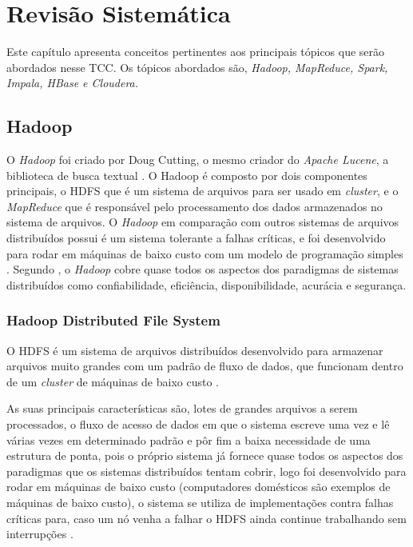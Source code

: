 \chapter[Revisão Sistemática]{Revisão Sistemática}

    Este capítulo apresenta conceitos pertinentes aos principais tópicos que serão abordados
    nesse TCC. Os tópicos abordados são, \textit{Hadoop, MapReduce, Spark, Impala, HBase e
    Cloudera.}

    \section{Hadoop}

        O \textit{Hadoop} foi criado por Doug Cutting, o mesmo criador do \textit{Apache Lucene}, a biblioteca de
        busca textual \cite{white2015}. O Hadoop é composto por dois componentes principais, o HDFS que é um
        sistema de arquivos para ser usado em \textit{cluster}, e o \textit{MapReduce} que é responsável pelo
        processamento dos dados armazenados no sistema de arquivos. O \textit{Hadoop} em comparação com
        outros sistemas de arquivos distribuídos possui é um sistema tolerante a falhas críticas, e foi desenvolvido
        para rodar em máquinas de baixo custo com um modelo de programação simples \cite{alam2014}. Segundo
        , o \textit{Hadoop} cobre quase todos os aspectos dos paradigmas de sistemas distribuídos
        como confiabilidade, eficiência, disponibilidade, acurácia e segurança.

        \subsection{Hadoop Distributed File System}

            O HDFS é um sistema de arquivos distribuídos desenvolvido para armazenar arquivos muito grandes
            com um padrão de fluxo de dados, que funcionam dentro de um \textit{cluster} de máquinas de
            baixo custo \cite{white2015}.

            As suas principais características são, lotes de grandes arquivos a serem processados, o fluxo de
            acesso de dados em que o sistema escreve uma vez e lê várias vezes em determinado padrão e
            pôr fim a baixa necessidade de uma estrutura de ponta, pois o próprio sistema já fornece quase
            todos os aspectos dos paradigmas que os sistemas distribuídos tentam cobrir, logo foi desenvolvido
            para rodar em máquinas de baixo custo (computadores domésticos são exemplos de máquinas de
            baixo custo), o sistema se utiliza de implementações contra falhas críticas para, caso um nó venha a
            falhar o HDFS ainda continue trabalhando sem interrupções \cite{white2015}.


